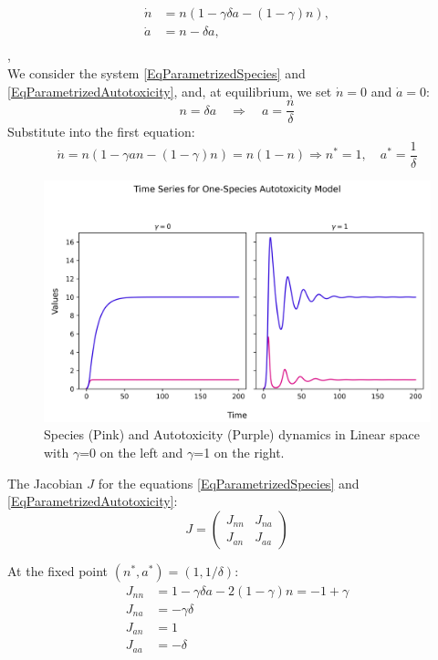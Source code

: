 \documentclass[11pt,a4paper,fleqn]{scrartcl}
\begin{document}
\begin{align}
\label{EqParametrizedSpecies}
\dot{n} &= n\left( 1 - \gamma \delta a - (1 - \gamma)n \right),\\
\label{EqParametrizedAutotoxicity}
\dot{a} &= n - \delta a,\\ \end{align},\\

We consider the system \ref{EqParametrizedSpecies} and \ref{EqParametrizedAutotoxicity}, and, at equilibrium, we set $\dot{n} = 0$ and $\dot{a} = 0$:
\[
n = \delta a \quad \Rightarrow \quad a = \frac{n}{\delta}
\]
Substitute into the first equation:
\[
\dot{n} = n \left( 1 - \gamma a n - (1 - \gamma) n \right) = n(1 - n)
\Rightarrow n^* = 1, \quad a^* = \frac{1}{\delta}
\]


\begin{figure}[H]
    \centering
    \includegraphics[width=\linewidth]{SingleSpecies/time_series_single_species.png}
    \caption{Species (Pink) and Autotoxicity (Purple) dynamics in Linear space with $\gamma$=0 on the left and $\gamma$=1 on the right.}
\end{figure}
\label{simulationOneSpecies}


The Jacobian $J$ for the equations \ref{EqParametrizedSpecies} and \ref{EqParametrizedAutotoxicity}:
\[
J = 
\begin{pmatrix}
J_{nn} & J_{na} \\
J_{an} & J_{aa}
\end{pmatrix}
\]

At the fixed point $(n^*, a^*) = (1, 1/\delta)$:
\begin{align*}
J_{nn} &= 1 - \gamma \delta a - 2(1 - \gamma)n = -1 + \gamma \\
J_{na} &= -\gamma \delta \\
J_{an} &= 1\\
J_{aa}&= -\delta\\
\end{align*}
\end{document}

